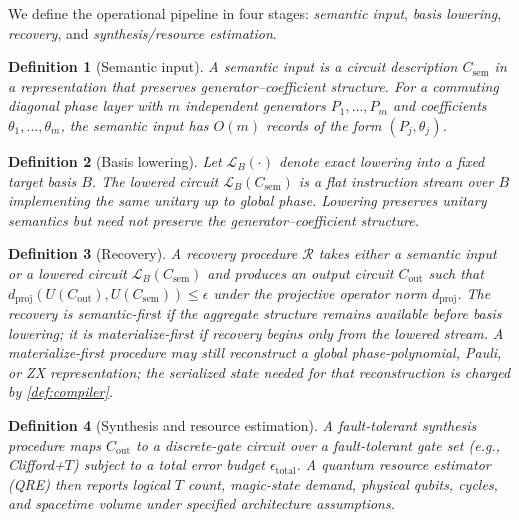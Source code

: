 \documentclass[a4paper,twocolumn,10pt,unpublished]{quantumarticle}
\newtheorem{definition}{Definition}
\begin{document}
We define the operational pipeline in four stages:
\emph{semantic input}, \emph{basis lowering}, \emph{recovery}, and
\emph{synthesis/resource estimation}.

\begin{definition}[Semantic input]
\label{def:semantic-input}
A semantic input is a circuit description $C_{\mathrm{sem}}$ in a
representation that preserves generator--coefficient structure. For a
commuting diagonal phase layer with $m$ independent generators
$P_1,\ldots,P_m$ and coefficients $\theta_1,\ldots,\theta_m$, the semantic
input has $O(m)$ records of the form $(P_j, \theta_j)$.
\end{definition}

\begin{definition}[Basis lowering]
\label{def:lowering}
Let $\mathcal{L}_B(\cdot)$ denote exact lowering into a fixed target basis
$B$. The lowered circuit $\mathcal{L}_B(C_{\mathrm{sem}})$ is a flat
instruction stream over $B$ implementing the same unitary up to global
phase. Lowering preserves unitary semantics but need not preserve the
generator--coefficient structure.
\end{definition}

\begin{definition}[Recovery]
\label{def:recovery}
A recovery procedure $\mathcal{R}$ takes either a semantic input or a
lowered circuit $\mathcal{L}_B(C_{\mathrm{sem}})$ and produces an output circuit
$C_{\mathrm{out}}$ such that
$d_{\mathrm{proj}}(U(C_{\mathrm{out}}), U(C_{\mathrm{sem}})) \leq \epsilon$
under the projective operator norm $d_{\mathrm{proj}}$. The recovery is
\emph{semantic-first} if the aggregate structure remains available before
basis lowering; it is \emph{materialize-first} if recovery begins only from
the lowered stream.  A materialize-first procedure may still reconstruct a
global phase-polynomial, Pauli, or ZX representation; the serialized state
needed for that reconstruction is charged by \cref{def:compiler}.
\end{definition}

\begin{definition}[Synthesis and resource estimation]
\label{def:synthesis}
A fault-tolerant synthesis procedure maps $C_{\mathrm{out}}$ to a
discrete-gate circuit over a fault-tolerant gate set (e.g., Clifford+$T$)
subject to a total error budget $\epsilon_{\mathrm{total}}$. A quantum
resource estimator (QRE) then reports logical $T$ count, magic-state
demand, physical qubits, cycles, and spacetime volume under specified
architecture assumptions.
\end{definition}
\end{document}

